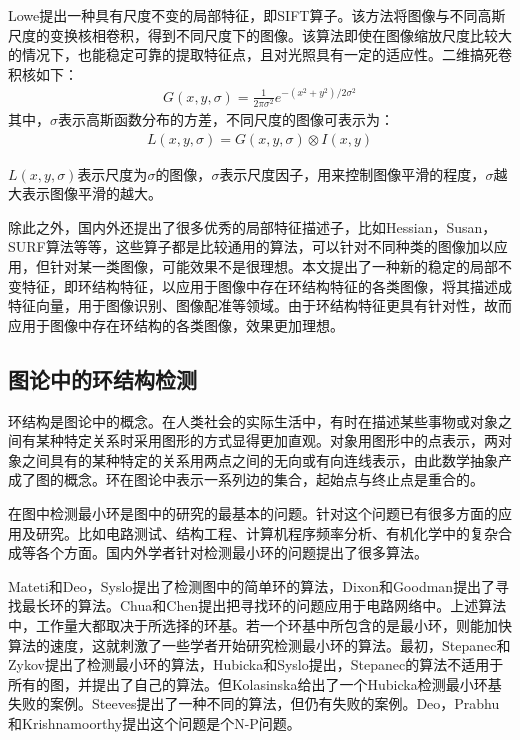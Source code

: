 Lowe提出一种具有尺度不变的局部特征，即SIFT算子\cite{lowe}。该方法将图像与不同高斯尺度的变换核相卷积，得到不同尺度下的图像。该算法即使在图像缩放尺度比较大的情况下，也能稳定可靠的提取特征点，且对光照具有一定的适应性。二维搞死卷积核如下：
\begin{align}
G(x, y, \sigma) = \frac{1}{2\pi\sigma^2}e^{-(x^2+y^2)/2\sigma^2}
\end{align}
其中，$\sigma$表示高斯函数分布的方差，不同尺度的图像可表示为：
\begin{align}
L(x, y, \sigma) = G(x, y, \sigma) \otimes I(x, y)
\end{align}

$L(x, y, \sigma)$表示尺度为$\sigma$的图像，$\sigma$表示尺度因子，用来控制图像平滑的程度，$\sigma$越大表示图像平滑的越大。

除此之外，国内外还提出了很多优秀的局部特征描述子，比如Hessian，Susan\cite{smith}，SURF\cite{bay}算法等等，这些算子都是比较通用的算法，可以针对不同种类的图像加以应用，但针对某一类图像，可能效果不是很理想。本文提出了一种新的稳定的局部不变特征，即环结构特征，以应用于图像中存在环结构特征的各类图像，将其描述成特征向量，用于图像识别、图像配准等领域。由于环结构特征更具有针对性，故而应用于图像中存在环结构的各类图像，效果更加理想。

\subsection{图论中的环结构检测}
\label{sec:complicatedtable}

环结构是图论中的概念。在人类社会的实际生活中，有时在描述某些事物或对象之间有某种特定关系时采用图形的方式显得更加直观。对象用图形中的点表示，两对象之间具有的某种特定的关系用两点之间的无向或有向连线表示，由此数学抽象产成了图的概念\cite{xujunming}。环在图论中表示一系列边的集合，起始点与终止点是重合的。

在图中检测最小环是图中的研究的最基本的问题。针对这个问题已有很多方面的应用及研究。比如电路测试、结构工程、计算机程序频率分析、有机化学中的复杂合成等各个方面。国内外学者针对检测最小环的问题提出了很多算法。

Mateti和Deo\cite{mateti}，Syslo\cite{syslo}提出了检测图中的简单环的算法，Dixon和Goodman\cite{goodman}提出了寻找最长环的算法。Chua和Chen提出把寻找环的问题应用于电路网络中\cite{chua}。上述算法中，工作量大都取决于所选择的环基。若一个环基中所包含的是最小环，则能加快算法的速度，这就刺激了一些学者开始研究检测最小环的算法。最初，Stepanec和Zykov提出了检测最小环的算法\cite{stepanec}，Hubicka和Syslo\cite{hubicka}提出，Stepanec的算法不适用于所有的图，并提出了自己的算法。但Kolasinska\cite{kola}给出了一个Hubicka检测最小环基失败的案例。Steeves提出了一种不同的算法，但仍有失败的案例。Deo，Prabhu和Krishnamoorthy\cite{deo}提出这个问题是个N-P问题。

